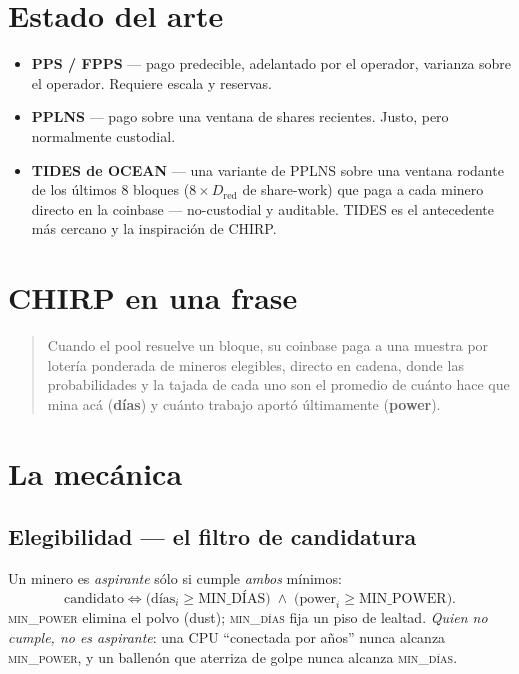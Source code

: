 \documentclass[11pt]{article}
\begin{document}
\section{Estado del arte}
\begin{itemize}[leftmargin=1.4em]
  \item \textbf{PPS / FPPS} --- pago predecible, adelantado por el operador, varianza sobre el
  operador. Requiere escala y reservas.
  \item \textbf{PPLNS} --- pago sobre una ventana de shares recientes. Justo, pero normalmente
  custodial.
  \item \textbf{TIDES de OCEAN} --- una variante de PPLNS sobre una ventana rodante de los \'ultimos
  8 bloques ($8 \times D_{\text{red}}$ de share-work) que paga a cada minero directo en la coinbase
  --- no-custodial y auditable. TIDES es el antecedente m\'as cercano y la inspiraci\'on de CHIRP.
\end{itemize}

\section{CHIRP en una frase}
\begin{quote}
Cuando el pool resuelve un bloque, su coinbase paga a una muestra por loter\'ia ponderada de mineros
elegibles, directo en cadena, donde las probabilidades y la tajada de cada uno son el promedio de
cu\'anto hace que mina ac\'a (\textbf{d\'ias}) y cu\'anto trabajo aport\'o \'ultimamente (\textbf{power}).
\end{quote}

\section{La mec\'anica}

\subsection{Elegibilidad --- el filtro de candidatura}
Un minero es \emph{aspirante} s\'olo si cumple \emph{ambos} m\'inimos:
\[
  \text{candidato} \iff \big( \text{d\'ias}_i \ge \text{MIN\_D\'IAS} \big) \;\wedge\;
  \big( \text{power}_i \ge \text{MIN\_POWER} \big).
\]
\textsc{min\_power} elimina el polvo (dust); \textsc{min\_d\'ias} fija un piso de lealtad. \emph{Quien
no cumple, no es aspirante}: una CPU ``conectada por a\~nos'' nunca alcanza \textsc{min\_power}, y un
ballen\'on que aterriza de golpe nunca alcanza \textsc{min\_d\'ias}.
\end{document}
